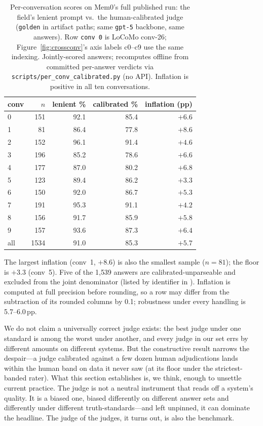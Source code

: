 \documentclass[11pt]{article}
\begin{document}
\begin{table}[t]
\centering
\caption{Per-conversation scores on Mem0's full published run: the field's lenient prompt vs.\ the human-calibrated judge (\texttt{golden} in artifact paths; same \texttt{gpt-5} backbone, same answers). Row \texttt{conv 0} is LoCoMo conv-26; Figure~\ref{fig:crossconv}'s axis labels c0--c9 use the same indexing. Jointly-scored answers; recomputes offline from committed per-answer verdicts via \texttt{scripts/per\_conv\_calibrated.py} (no API). Inflation is positive in all ten conversations.}
\label{tab:perconv}
\small
\begin{tabular}{lrrrr}
\toprule
conv & $n$ & lenient \% & calibrated \% & inflation (pp) \\
\midrule
0 & 151 & 92.1 & 85.4 & $+6.6$ \\
1 & 81  & 86.4 & 77.8 & $+8.6$ \\
2 & 152 & 96.1 & 91.4 & $+4.6$ \\
3 & 196 & 85.2 & 78.6 & $+6.6$ \\
4 & 177 & 87.0 & 80.2 & $+6.8$ \\
5 & 123 & 89.4 & 86.2 & $+3.3$ \\
6 & 150 & 92.0 & 86.7 & $+5.3$ \\
7 & 191 & 95.3 & 91.1 & $+4.2$ \\
8 & 156 & 91.7 & 85.9 & $+5.8$ \\
9 & 157 & 93.6 & 87.3 & $+6.4$ \\
\midrule
all & 1534 & 91.0 & 85.3 & $+5.7$ \\
\bottomrule
\end{tabular}

\vspace{2pt}
{\footnotesize The largest inflation (conv~1, $+8.6$) is also the smallest sample ($n=81$); the floor is $+3.3$ (conv~5). Five of the 1{,}539 answers are calibrated-unparseable and excluded from the joint denominator (listed by identifier in ). Inflation is computed at full precision before rounding, so a row may differ from the subtraction of its rounded columns by 0.1; robustness under every handling is 5.7--6.0\,pp.}
\end{table}

We do not claim a universally correct judge exists: the best judge under one standard is among the worst under another, and every judge in our set errs by different amounts on different systems. But the constructive result narrows the despair---a judge calibrated against a few dozen human adjudications lands within the human band on data it never saw (at its floor under the strictest-banded rater). What this section establishes is, we think, enough to unsettle current practice. The judge is not a neutral instrument that reads off a system's quality. It is a biased one, biased differently on different answer sets and differently under different truth-standards---and left unpinned, it can dominate the headline. The judge of the judges, it turns out, is also the benchmark.
\end{document}
